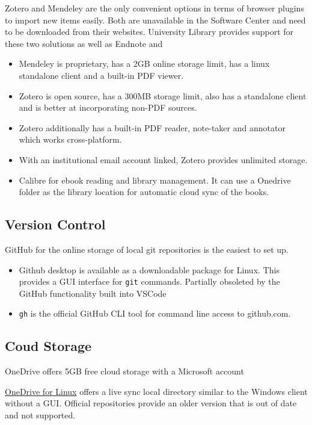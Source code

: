\documentclass[8pt,a4paper]{article}
\begin{document}
Zotero and Mendeley are the only convenient options in terms of browser plugins to import new items easily. Both are unavailable in the Software Center and need to be downloaded from their websites. University Library provides support for these two solutions as well as Endnote and

\begin{itemize}
	\item Mendeley is proprietary, has a 2GB online storage limit, has a linux standalone client and a built-in PDF viewer.
	\item Zotero is open source, has a 300MB storage limit, also has a standalone client and is better at incorporating non-PDF sources.
	\item Zotero additionally has a built-in PDF reader, note-taker and annotator which works cross-platform.
	\item With an institutional email account linked, Zotero provides unlimited storage.
	\item Calibre for ebook reading and library management. It can use a Onedrive folder as the library location for automatic cloud sync of the books.
\end{itemize}


\subsection{Version Control}

GitHub for the online storage of local git repositories is the easiest to set up.

\begin{itemize}
	\item Github desktop is available as a downloadable package for Linux. This provides a GUI interface for \texttt{git} commands. Partially obsoleted by the GitHub functionality built into VSCode
	\item \texttt{gh} is the official GitHub CLI tool for command line access to github.com.
\end{itemize}

\subsection{Coud Storage}

OneDrive offers 5GB free cloud storage with a Microsoft account

\href{https://github.com/abraunegg/onedrive/blob/master/docs/ubuntu-package-install.md}{OneDrive for Linux}
 offers a live sync local directory similar to the Windows client without a GUI. Official repositories provide an older version that is out of date and not supported.
\end{document}
